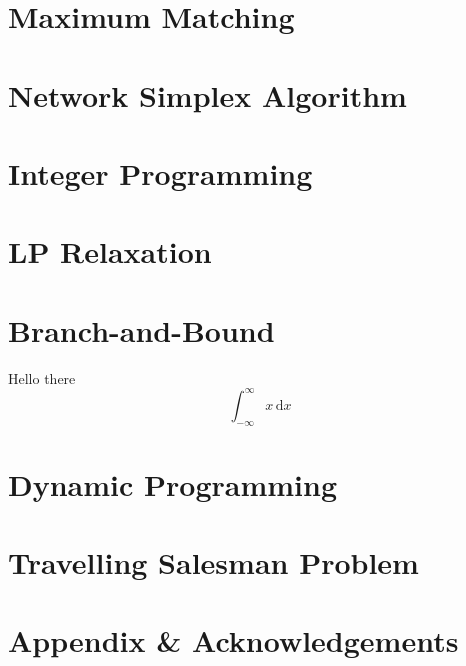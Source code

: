 \documentclass{article}
\begin{document}
\section{Maximum Matching}

\section{Network Simplex Algorithm}

\section{Integer Programming}

\section{LP Relaxation}

\section{Branch-and-Bound}

Hello there \begin{equation}
    \int_{-\infty}^{\infty} x \, \mathrm{d}x
\end{equation}


\section{Dynamic Programming}

\section{Travelling Salesman Problem}

\newpage 

\section*{Appendix \& Acknowledgements}
\end{document}
